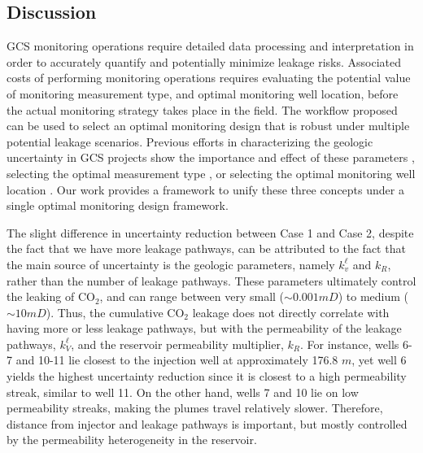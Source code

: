 \documentclass[a4paper,fleqn]{cas-sc}
\begin{document}
\subsection{Discussion}
GCS monitoring operations require detailed data processing and interpretation in order to accurately quantify and potentially minimize leakage risks. Associated costs of performing monitoring operations requires evaluating the potential value of monitoring measurement type, and optimal monitoring well location, before the actual monitoring strategy takes place in the field. The workflow proposed can be used to select an optimal monitoring design that is robust under multiple potential leakage scenarios. Previous efforts in characterizing the geologic uncertainty in GCS projects show the importance and effect of these parameters \citep{Jia2018104, Chen2020, Pawar2022}, selecting the optimal measurement type \citep{Yonkofski2016, Oladyshkin2013671}, or selecting the optimal monitoring well location \citep{Sun2013, Sun2019}. Our work provides a framework to unify these three concepts under a single optimal monitoring design framework.

The slight difference in uncertainty reduction between Case 1 and Case 2, despite the fact that we have more leakage pathways, can be attributed to the fact that the main source of uncertainty is the geologic parameters, namely $k_v^\ell$ and $k_R$, rather than the number of leakage pathways. These parameters ultimately control the leaking of CO$_2$, and can range between very small ($\sim 0.001 mD$) to medium ($\sim 10 mD$). Thus, the cumulative CO$_2$ leakage does not directly correlate with having more or less leakage pathways, but with the permeability of the leakage pathways, $k_V^\ell$, and the reservoir permeability multiplier, $k_R$. For instance, wells 6-7 and 10-11 lie closest to the injection well at approximately 176.8 $m$, yet well 6 yields the highest uncertainty reduction since it is closest to a high permeability streak, similar to well 11. On the other hand, wells 7 and 10 lie on low permeability streaks, making the plumes travel relatively slower. Therefore, distance from injector and leakage pathways is important, but mostly controlled by the permeability heterogeneity in the reservoir.
\end{document}
